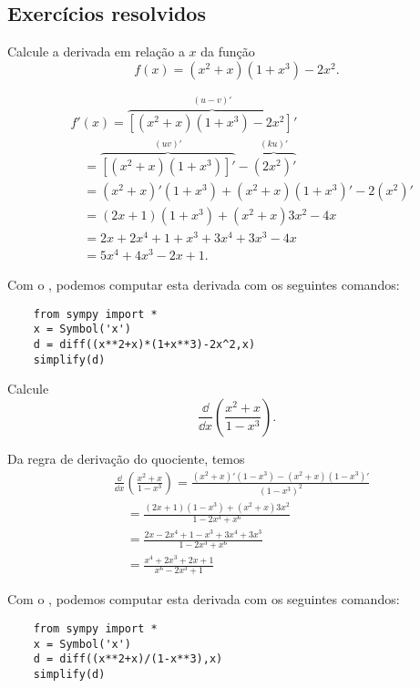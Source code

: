 \subsection{Exercícios resolvidos}

\begin{exeresol}
  Calcule a derivada em relação a $x$ da função
  \begin{equation}
    f(x) = (x^2+x)(1 + x^3) - 2x^2.
  \end{equation}
\end{exeresol}
\begin{resol}
  \begin{align}
    & f'(x) = \overbrace{\left[(x^2+x)(1 + x^3) - 2x^2\right]'}^{(u-v)'} \\
    & \text{}\quad = \overbrace{\left[(x^2+x)(1 + x^3)\right]'}^{(uv)'} - \overbrace{(2x^2)'}^{(ku)'} \\
    & \text{}\quad = (x^2+x)'(1+x^3) + (x^2+x)(1+x^3)' - 2(x^2)'\\
    & \text{}\quad = (2x+1)(1+x^3) + (x^2+x)3x^2 - 4x\\
    & \text{}\quad = 2x+2x^4+1+x^3+3x^4+3x^3-4x\\
    & \text{}\quad = 5x^4+4x^3-2x+1.
  \end{align}
  
  \ifispython
  Com o \sympy, podemos computar esta derivada com os seguintes comandos:
  \begin{lstlisting}
    from sympy import *
    x = Symbol('x')
    d = diff((x**2+x)*(1+x**3)-2x^2,x)
    simplify(d)
  \end{lstlisting}
  \fi
\end{resol}

\begin{exeresol}
  Calcule
  \begin{equation}
    \frac{\dd}{\dd x}\left(\frac{x^2+x}{1-x^3}\right).
  \end{equation}
\end{exeresol}
\begin{resol}
  Da regra de derivação do quociente, temos
  \begin{align}
    & \frac{\dd}{\dd x}\left(\frac{x^2+x}{1-x^3}\right) = \frac{(x^2+x)'(1-x^3)-(x^2+x)(1-x^3)'}{(1-x^3)^2}\\
    & \text{}\quad = \frac{(2x+1)(1-x^3)+(x^2+x)3x^2}{1-2x^3+x^6} \\
    & \text{}\quad = \frac{2x-2x^4+1-x^3+3x^4+3x^3}{1-2x^3+x^6} \\
    & \text{}\quad = \frac{x^4+2x^3+2x+1}{x^6-2x^3+1}
  \end{align}
  
  \ifispython
  Com o \sympy, podemos computar esta derivada com os seguintes comandos:
  \begin{lstlisting}
    from sympy import *
    x = Symbol('x')
    d = diff((x**2+x)/(1-x**3),x)
    simplify(d)
  \end{lstlisting}
  \fi
\end{resol}

